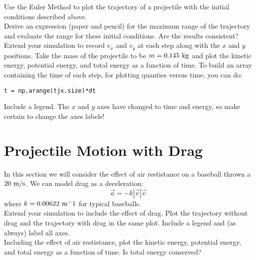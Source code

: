 \plot Use the Euler Method to plot the trajectory of a projectile with the initial conditions described above.\\

\plot Derive an expression (paper and pencil) for the maximum range of the trajectory and evaluate the range for these initial conditions.  Are the results consistent?\\

\plot Extend your simulation to record $v_x$ and $v_y$ at each step
along with the $x$ and $y$ positions.  Take the mass of the projectile
to be $m=0.145~\rm kg$ and plot the kinetic energy, potential energy,
and total energy as a function of time.  To build an array containing
the time of each step, for plotting quanties versus time, you can do:
\begin{verbatim}
t = np.arange(tjx.size)*dt
\end{verbatim}
Include a legend. The $x$ and $y$ axes have changed to time and energy, so make certain to change the axes labels!\\

\section{Projectile Motion with Drag}

In this section we will consider the effect of air restistance on a baseball thrown a $20~\rm m/s$.
We can model drag as a deceleration:
\begin{displaymath}
\vec{a} = -k |\vec{v}| \vec{v}
\end{displaymath}
where $k=0.00622~\rm m^-1$ for typical baseballs.\\

\plot Extend your simulation to include the effect of drag.  Plot the trajectory without drag and the trajectory with drag in the same plot.  Include a legend and (as always) label all axes.\\

\plot Including the effect of air restistance, plot the kinetic
energy, potential energy, and total energy as a function of time.  Is
total energy conserved?\\

